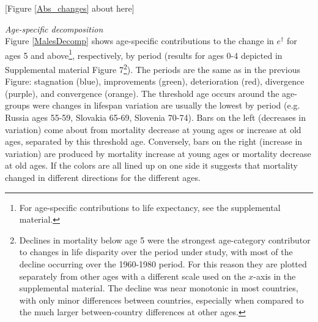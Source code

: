 \documentclass{article}
\begin{document}
\begin{spacing}{1.5}
\begin{center}
[Figure \ref{Abs_changes} about here]
\end{center}

\emph{Age-specific decomposition}\\



Figure  \ref{MalesDecomp} shows age-specific contributions to the change in $e^\dagger$ for ages 5 and above\footnote{For age-specific contributions to life expectancy, see the supplemental material.}, respectively, by period (results for ages 0-4 depicted in Supplemental material Figure 7\footnote{Declines in mortality below age 5 were the strongest age-category contributor to changes in life disparity over the period under study, with most of the decline occurring over the 1960-1980 period. For this reason they are plotted separately from other ages with a different scale used on the $x$-axis in the supplemental material. The decline was near monotonic in most countries, with only minor differences between countries, especially when compared to the much larger between-country differences at other ages.}). The periods are the same as in the previous Figure:  stagnation (blue), improvements (green), deterioration (red), divergence (purple), and convergence (orange). The threshold age occurs around the age-groups were changes in lifespan variation are usually the lowest by period (e.g. Russia ages 55-59, Slovakia 65-69, Slovenia 70-74). Bars on the left (decreases in variation) come about from mortality decrease at young ages or increase at old ages, separated by this threshold age. Conversely, bars on the right (increase in variation) are produced by mortality increase at young ages or mortality decrease at old ages. If the colors are all lined up on one side it suggests that mortality changed in different directions for the different ages. \\



\end{spacing}
\end{document}
